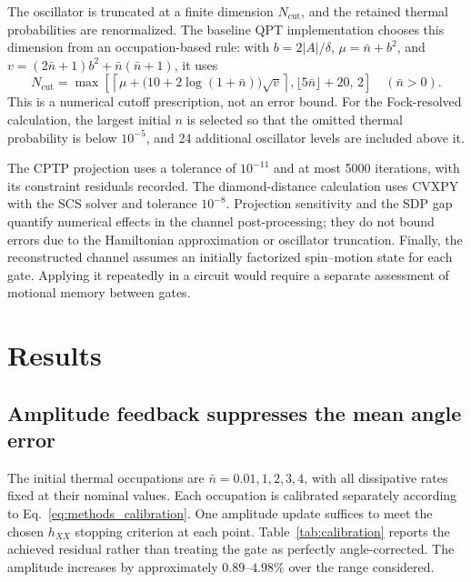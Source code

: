 \documentclass[a4paper,11pt]{article}
\begin{document}
The oscillator is truncated at a finite dimension $N_{\mathrm{cut}}$,
and the retained thermal probabilities are renormalized. The baseline
QPT implementation chooses this dimension from an occupation-based rule:
with $b=2|A|/\delta$, $\mu=\bar n+b^2$, and
$v=(2\bar n+1)b^2+\bar n(\bar n+1)$, it uses
\begin{equation}
 N_{\mathrm{cut}}=\max\!\left[
 \left\lceil\mu+\bigl(10+2\log(1+\bar n)\bigr)\sqrt v\right\rceil,
 \lfloor5\bar n\rfloor+20,\,2\right]
 \quad(\bar n>0).
\end{equation}
This is a numerical cutoff prescription, not an error bound.
For the Fock-resolved calculation, the largest initial $n$ is selected
so that the omitted thermal probability is below $10^{-5}$, and 24
additional oscillator levels are included above it.

The CPTP projection uses a tolerance of $10^{-11}$ and at most 5000
iterations, with its constraint residuals recorded. The diamond-distance
calculation uses CVXPY with the SCS solver and tolerance $10^{-8}$.
Projection sensitivity and the SDP gap quantify numerical effects in
the channel post-processing; they do not bound errors due to the
Hamiltonian approximation or oscillator truncation. Finally, the
reconstructed channel assumes an initially factorized spin--motion state
for each gate. Applying it repeatedly in a circuit would require a
separate assessment of motional memory between gates.

\section{Results}
\label{sec:results}

\subsection{Amplitude feedback suppresses the mean angle error}

The initial thermal occupations are $\bar n=0.01,1,2,3,4$, with all
dissipative rates fixed at their nominal values. Each occupation is
calibrated separately according to Eq.~\eqref{eq:methods_calibration}.
One amplitude update suffices to meet the chosen $h_{XX}$ stopping
criterion at each point. Table~\ref{tab:calibration} reports the achieved
residual rather than treating the gate as perfectly angle-corrected.
The amplitude increases by approximately $0.89$--$4.98\%$ over the
range considered.
\end{document}
